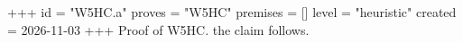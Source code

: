 +++
id = "W5HC.a"
proves = "W5HC"
premises = []
level = "heuristic"
created = 2026-11-03
+++
Proof of W5HC. the claim follows.

